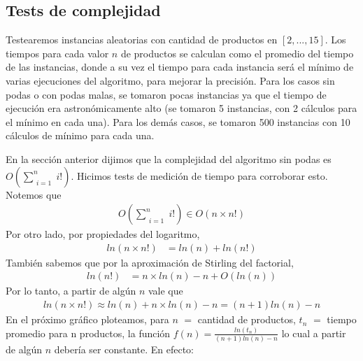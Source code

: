 \subsection{Tests de complejidad}
Testearemos instancias aleatorias con cantidad de productos en $[2,...,15]$. Los tiempos para cada valor $n$ de productos se calculan como el promedio del tiempo de las instancias, donde a su vez el tiempo para cada instancia será el mínimo de varias ejecuciones del algoritmo, para mejorar la precisión. Para los casos sin podas o con podas malas, se tomaron pocas instancias ya que el tiempo de ejecución era astronómicamente alto (se tomaron 5 instancias, con 2 cálculos para el mínimo en cada una). Para los demás casos, se tomaron 500 instancias con 10 cálculos de mínimo para cada una.

En la sección anterior dijimos que la complejidad del algoritmo sin podas es $O\left(\sum\limits_{\substack{i = 1}}^n i!\right)$. Hicimos tests de medición de tiempo para corroborar esto. Notemos que 
\begin{align*}
O\left(\sum\limits_{\substack{i = 1}}^n i!\right) \in O(n \times n!)
\end{align*}
Por otro lado, por propiedades del logaritmo, 
\begin{align*}
ln(n \times n!) &= ln(n) + ln(n!)
\end{align*}
También sabemos que por la aproximación de Stirling del factorial, 
\begin{align*}
ln(n!) &= n \times ln(n) - n + O(ln(n))
\end{align*}
Por lo tanto, a partir de algún $n$ vale que 
\begin{align*}
ln(n \times n!) \approx ln(n) + n \times ln(n) - n = (n+1) ln(n) - n
\end{align*}
En el próximo gráfico ploteamos, para $n$ $=$ cantidad de productos, $t_n$ $=$ tiempo promedio para n productos, la función $f(n) = \frac{ln(t_n)}{(n+1) ln(n) - n}$ lo cual a partir de algún $n$ debería ser constante. En efecto:

